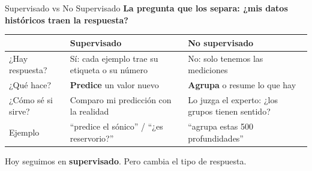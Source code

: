 \documentclass[aspectratio=169, 11pt]{beamer}
\begin{document}
\begin{frame}[shrink=8]{Supervisado vs No Supervisado}
  \vspace{-4pt}
  {\small\color{arcaDark}\bfseries
    La pregunta que los separa: \textbf{¿mis datos históricos traen la respuesta?}}

  \vspace{6pt}
  \centering
  {\footnotesize
  \renewcommand{\arraystretch}{1.5}
  \begin{tabular}{@{}p{2.6cm} p{4.5cm} p{4.5cm}@{}}
    \toprule
     & {\bfseries\color{arcaRed} Supervisado} & {\bfseries\color{codeBlue} No supervisado} \\
    \midrule
    \rowcolor{arcaGray}
    ¿Hay respuesta? & Sí: cada ejemplo trae su etiqueta o su número
      & No: solo tenemos las mediciones \\
    ¿Qué hace? & \textbf{Predice} un valor nuevo
      & \textbf{Agrupa} o resume lo que hay \\
    ¿Cómo sé si sirve? & Comparo mi predicción con la realidad
      & Lo juzga el experto: ¿los grupos tienen sentido? \\
    Ejemplo & ``predice el sónico'' / ``¿es reservorio?''
      & ``agrupa estas 500 profundidades'' \\
    \bottomrule
  \end{tabular}
  }

  \vspace{8pt}
  {\footnotesize\color{textMuted}
    \faLightbulb[regular]\hspace{4pt}%
    Hoy seguimos en \textbf{supervisado}. Pero cambia el tipo de respuesta.}
\end{frame}
\end{document}
